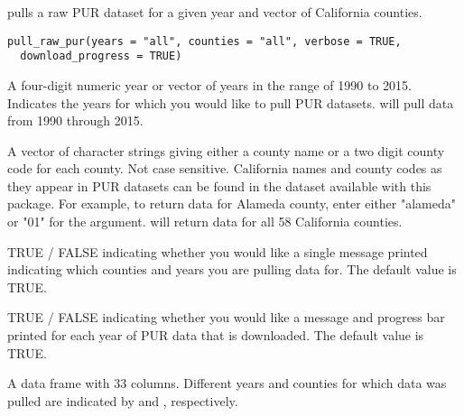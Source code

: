 \documentclass[a4paper]{book}
\begin{document}
%
\begin{Description}\relax
{} pulls a raw PUR dataset for a given year and vector of
California counties.
\end{Description}
%
\begin{Usage}
\begin{verbatim}
pull_raw_pur(years = "all", counties = "all", verbose = TRUE,
  download_progress = TRUE)
\end{verbatim}
\end{Usage}
%
\begin{Arguments}
\begin{ldescription}
\item[\code{years}] A four-digit numeric year or vector of years in the range of
1990 to 2015. Indicates the years for which you would like to pull PUR
datasets.  will pull data from 1990 through 2015.

\item[\code{counties}] A vector of character strings giving either a county name or
a two digit county code for each county. Not case sensitive. California names
and county codes as they appear in PUR datasets can be found in the
 dataset available with this package. For example, to
return data for Alameda county, enter either "alameda" or "01" for the
 argument.  will return data for
all 58 California counties.

\item[\code{verbose}] TRUE / FALSE indicating whether you would like a single message
printed indicating which counties and years you are pulling data for. The
default value is TRUE.

\item[\code{download\_progress}] TRUE / FALSE indicating whether you would like a
message and progress bar printed for each year of PUR data that is downloaded.
The default value is TRUE.
\end{ldescription}
\end{Arguments}
%
\begin{Value}
A data frame with 33 columns. Different years and counties for which
data was pulled are indicated by  and ,
respectively.
\end{Value}
%
\end{document}
